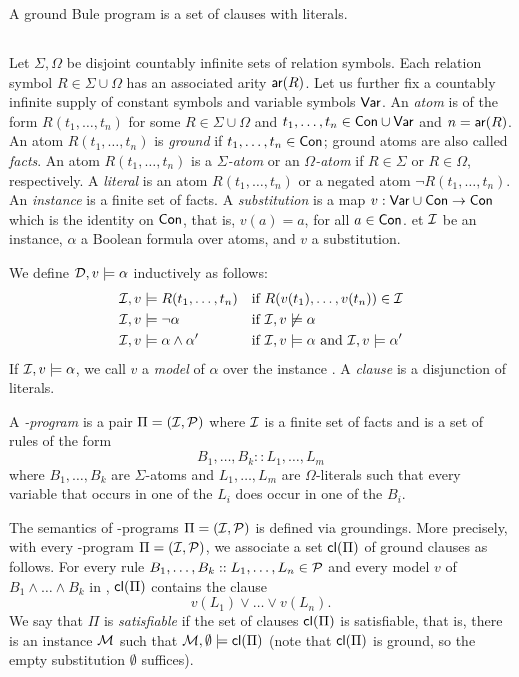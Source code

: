 \documentclass[runningheads]{llncs}
\begin{document}
A ground Bule program is a set of clauses with literals. 

\subsection{\bcore}

Let $\Sigma,\Omega$ be disjoint countably infinite sets of relation symbols.  
Each relation symbol $R\in \Sigma\cup\Omega$ has an associated arity $\mathsf{ar}(R)$.  
Let us further fix a countably infinite supply of constant symbols  and variable symbols $\mathsf{Var}$.  
An \emph{atom} is of the form $R(t_1,\ldots,t_n)$ for some $R\in \Sigma\cup\Omega$ and $t_1,\ldots,t_n\in\mathsf{Con}\cup\mathsf{Var}$ and $n=\mathsf{ar}(R)$. 
An atom $R(t_1,\ldots,t_n)$ is \emph{ground} if $t_1,\ldots,t_n\in\mathsf{Con}$; ground atoms are also called \emph{facts}. 
An atom $R(t_1,\ldots,t_n)$ is a \emph{$\Sigma$-atom} or an \emph{$\Omega$-atom} if $R\in \Sigma$ or $R\in \Omega$, respectively. 
A \emph{literal} is an atom $R(t_1,\ldots,t_n)$ or a negated atom $\neg R(t_1,\ldots,t_n)$. 
An \emph{instance} is a finite set of facts. A \emph{substitution} is a map $v:\mathsf{Var}\cup\mathsf{Con}\to\mathsf{Con}$ which is the identity on $\mathsf{Con}$, that is, $v(a)=a$, for all $a\in\mathsf{Con}$.
et $\mathcal{I}$ be an instance, $\alpha$ a Boolean formula over atoms, and $v$ a substitution. 

We define $\mathcal{D},v\models \alpha$ inductively as follows: 
%
\begin{align*}
  \mathcal{I},v & \models R(t_1,\ldots,t_n) && \text{if
  $R(v(t_1),\ldots,v(t_n))\in \mathcal{I}$} \\
  \mathcal{I}, v& \models \neg \alpha && \text{if $\mathcal{I},v\not\models \alpha$}
  \\
  \mathcal{I}, v& \models \alpha \wedge \alpha' && \text{if $\mathcal{I},v\models
  \alpha$ and $\mathcal{I},v\models\alpha'$}
\end{align*}
%
If $\mathcal{I},v\models\alpha$, we call $v$ a \emph{model} of $\alpha$ over the instance \Imc. 
A \emph{clause} is a disjunction of literals.

A \emph{\bcore-program} is a pair $\Pi=(\mathcal{I},\mathcal{P})$ where $\mathcal{I}$ is a finite set of facts and \Pmc is a set of rules of the form 
%
\[B_1, \ldots, B_k :: L_1, \ldots, L_m\]
%
where $B_1,\ldots,B_k$ are $\Sigma$-atoms and $L_1,\ldots,L_m$ are $\Omega$-literals such that every variable that occurs in one of the $L_i$ does occur in one of the $B_i$.

The semantics of \bcore-programs $\Pi=(\mathcal{I},\mathcal{P})$ is defined via groundings. 
More precisely, with every \bcore-program $\Pi=(\mathcal{I},\mathcal{P})$, we associate a set $\mathsf{cl}(\Pi)$ of ground clauses as follows.  
For every rule $B_1,\ldots,B_k :: L_1,\ldots, L_n\in\mathcal{P}$ and every model $v$ of $B_1\wedge\ldots\wedge B_k$ in \Imc, $\mathsf{cl}(\Pi)$ contains the clause
%
\[v(L_1)\vee\ldots\vee v(L_n).\]
%
We say that $\Pi$ is \emph{satisfiable} if the set of clauses $\mathsf{cl}(\Pi)$ is satisfiable, that is, 
there is an instance $\mathcal{M}$ such that $\mathcal{M},\emptyset \models\mathsf{cl}(\Pi)$ (note that $\mathsf{cl}(\Pi)$ is ground, so the empty substitution $\emptyset$ suffices).
\end{document}
